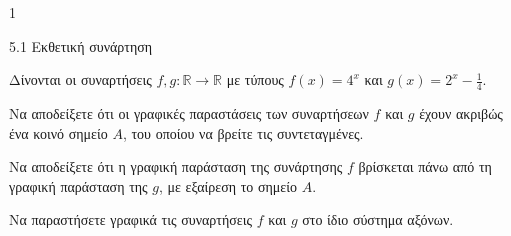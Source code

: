 \begin{ylh}{1}
\item 5.1 Εκθετική συνάρτηση
\end{ylh}
Δίνονται οι συναρτήσεις $f, g: \mathbb{R} \rightarrow \mathbb{R}$ με τύπους $f(x) = 4^x$ και $g(x) = 2^x - \frac{1}{4}$.
\begin{alist}
\item Να αποδείξετε ότι οι γραφικές παραστάσεις των συναρτήσεων $f$ και $g$ έχουν ακριβώς ένα κοινό σημείο $A$, του οποίου να βρείτε τις συντεταγμένες.
\item Να αποδείξετε ότι η γραφική παράσταση της συνάρτησης $f$ βρίσκεται πάνω από τη γραφική παράσταση της $g$, με εξαίρεση το σημείο $A$.
\item Να παραστήσετε γραφικά τις συναρτήσεις $f$ και $g$ στο ίδιο σύστημα αξόνων.
\end{alist}

